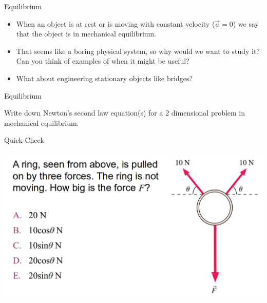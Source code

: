 \documentclass{beamer}
\newcommand{\red}[1]{{\color{red}{#1}}}
\newcommand{\checkL}[2]{\begin{textblock*}{1cm}(#1,#2){\Large \red{\Checkmark}}\end{textblock*}}
\begin{document}
\begin{frame}{Equilibrium}
\begin{itemize}
   \item When an object is at rest or is moving with constant velocity ($\vec{a}=0$) we say that the object is in mechanical equilibrium.
   \item<2-> That seems like a boring physical system, so why would we want to study it? Can you think of examples of when it might be useful?
   \item<3-> What about engineering stationary objects like bridges?
\end{itemize}
\begin{center}
\end{center}
\end{frame}

\begin{frame}{Equilibrium}
\begin{center}
   Write down Newton's second law equation(s) for a 2 dimensional problem in mechanical equilibrium.
\end{center}
\end{frame}

\begin{frame}{Quick Check}
\begin{center}
   \includegraphics[width=\textwidth]{../figures/QC6_2.png}
\end{center}
\only<2>{\checkL{1.0cm}{6.5cm}}
\end{frame}
\end{document}
